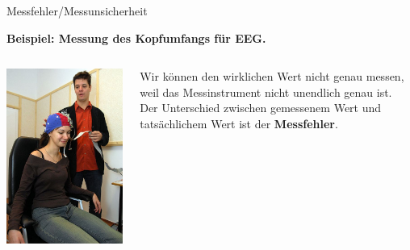 \documentclass{beamer}
\begin{document}


\begin{frame}{Messfehler/Messunsicherheit}

\textbf{Beispiel: Messung des Kopfumfangs für EEG.}  \\


\begin{columns}[c]
    \begin{column}{3cm}
        \includegraphics[width=\textwidth]{eeg_probandin_und_experimentator.png}
    \end{column}

        \begin{column}{7cm}

        


Wir können den wirklichen Wert nicht genau messen, weil das Messinstrument nicht unendlich genau ist. Der Unterschied zwischen gemessenem Wert und tatsächlichem Wert ist der \textbf{Messfehler}.  \\


\end{column}
\end{columns}
\end{frame}
\end{document}
